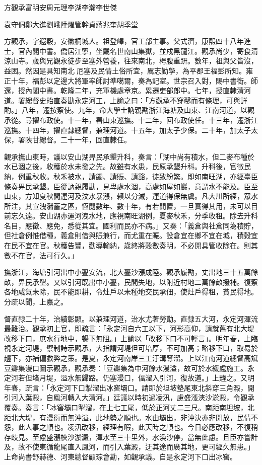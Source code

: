 
\begin{pinyinscope}
方觀承富明安周元理李湖李瀚李世傑

袁守侗鄭大進劉峨陸燿管幹貞蔣兆奎胡季堂

方觀承，字遐穀，安徽桐城人。祖登嶧，官工部主事。父式濟，康熙四十八年進士，官內閣中書。僑居江寧，坐戴名世南山集獄，並戍黑龍江。觀承尚少，寄食清涼山寺。歲與兄觀永徒步至塞外營養，往來南北，枵腹重趼。數年，祖與父皆沒，益困。然因是具知南北厄塞及民情土俗所宜，厲志勤學，為平郡王福彭所知。雍正十年，福彭以定邊大將軍率師討準噶爾，奏為記室。世宗召入對，賜中書銜。師還，授內閣中書。乾隆二年，充軍機處章京。累遷吏部郎中。七年，授直隸清河道。署總督史貽直奏勘永定河工，上諭之曰：「方觀承不穿鑿而有條理，可與詳酌。」八年，遷按察使。九年，命大學士訥親勘浙江海塘及山東、江南河道，以觀承從。尋擢布政使。十一年，署山東巡撫。十二年，回布政使任。十三年，遷浙江巡撫。十四年，擢直隸總督，兼理河道。十五年，加太子少保。二十年，加太子太保，署陜甘總督。二十一年，回直隸任。

觀承撫山東時，議以安山湖畀民承墾升科，奏言：「湖中尚有積水，但二麥布種於水已涸之後，收穫於水未發之先。故雖有水患，民原承墾升科。升科後，官徵民納，例重秋收。秋禾被水，請蠲、請賑、請豁，徒致紛繁。即如南旺湖，亦經臺臣條奏畀民承墾。臣從訥親履勘，見卑處水涸，高處如屋如巖，意謂水不能及。臣至山東，方知夏秋間運河及汶水暴漲，賴以分減，運道得保無虞。凡大川所經，眾水所注，其宣洩瀦蓄之區，恆閱數年、數十年，有若閒置，一旦實得其用，未可以目前忘久遠。安山湖亦運河洩水地，應視南旺湖例，夏麥秋禾，分季收租。除去升科名目，應徵、應免，悉從其宜。國利而民亦不病。」又奏：「義倉與社倉同為積貯，但社倉例惟借種，義倉則借與賑兼行，而尤重在賑。設倉宜在鄉不宜在城，積穀宜在民不宜在官。秋穫告豐，勸導輸納，歲終將穀數奏明，不必開具管收除在。則其數不在官，法可行久。」

撫浙江，海塘引河出中小亹安流，北大亹沙漲成陸。觀承履勘，丈出地三十五萬餘畝，畀民承墾。又以引河既出中小亹，民間失地，以附近村地二萬餘畝撥補。復察各地咸氣未除，民不能即耕，令灶戶以未種地交民承佃，使灶戶得租，貧民得地。分疏以聞，上嘉之。

督直隸二十年，治績彰顯。以兼理河道，治水尤著勞勩。直隸五大河，永定河渾流最難治。觀承初上官，即疏言：「永定河自六工以下，河形高仰，請就舊有北大堤改移下口，庶水行地中，暢下無阻。」上諭以「改移下口不可輕言」。明年春，上臨視永定河堤，禦制詩示觀承，大指謂河堤但可培厚，不可加高；略移下口，取易於趨下，亦補偏救弊之策。是夏，永定河南岸三工汙溝奪溜。上以江南河道總督高斌豆瓣集漫口圖示觀承，觀承奏：「豆瓣集為中河餘水漫溢，故可於水緩處施工。永定河若但堵月堤，溢水無歸路。仍塞漫口，偪溜入引河，復故道。」上韙之。又明年春，疏言：「永定河下口掣溜出冰窖壩口。請即於坦坡墊尾東北斜穿三角澱，開引河入葉澱，自鳳河轉入大清河。」廷議以時初過凌汛，慮盛漲浹沙淤澱，令觀承覆奏。奏言：「冰窖壩口掣溜，在上七工尾，低於正河丈二三尺。南距南坦坡，北距北大堤，有漫衍而無沖溢，此地勢之順也。水由壩出，非沖決亦非開放，民情不怨，此人事之順也。凌汛改移，經理有暇，此天時之順也。今日必應改移，不復稍存歧見。至慮盛漲梜沙淤澱，渾水至三十里外，水渙沙停，當無此慮。且臣亦嘗計及，故不使東循龍尾直入鳳河，而引入葉澱，迂其途而廣其地，更可經久無患。」上命尚書舒赫德、河東總督顧琮會勘，如觀承議。自是永定河下口出冰窖。


\end{pinyinscope}

